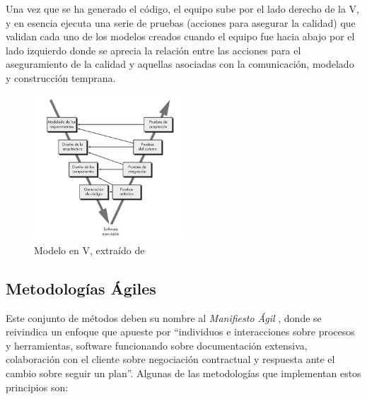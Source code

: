 \begin{itemize}
            Una vez que se ha generado el código, el equipo sube por el lado derecho de la V, y en esencia ejecuta una serie de pruebas (acciones para asegurar la calidad) que validan cada uno de los modelos creados cuando el equipo fue hacia abajo por el lado izquierdo donde se aprecia la relación entre las acciones para  el aseguramiento de la calidad y aquellas asociadas con la comunicación, modelado y construcción temprana. 
        
            \begin{figure}[h]
                \centering
                \includegraphics[width=0.5\textwidth]{figures/en v.JPG}
                \caption[Modelo en V]{Modelo en V, extraído de \cite{pressman_software_2005}}
                \label{fig:metodologia:modelo_v}
            \end{figure}
        \end{itemize}

    \subsection{Metodologías Ágiles}

        Este conjunto de métodos deben su nombre al \textit{Manifiesto Ágil} \cite{varios_autores_manifiesto_2001}, donde se reivindica un enfoque que apueste por ``individuos e interacciones sobre procesos y herramientas, software funcionando sobre documentación extensiva, colaboración con el cliente sobre negociación contractual y respuesta ante el cambio sobre seguir un plan''.
        Algunas de las metodologías que implementan estos principios son:
    
